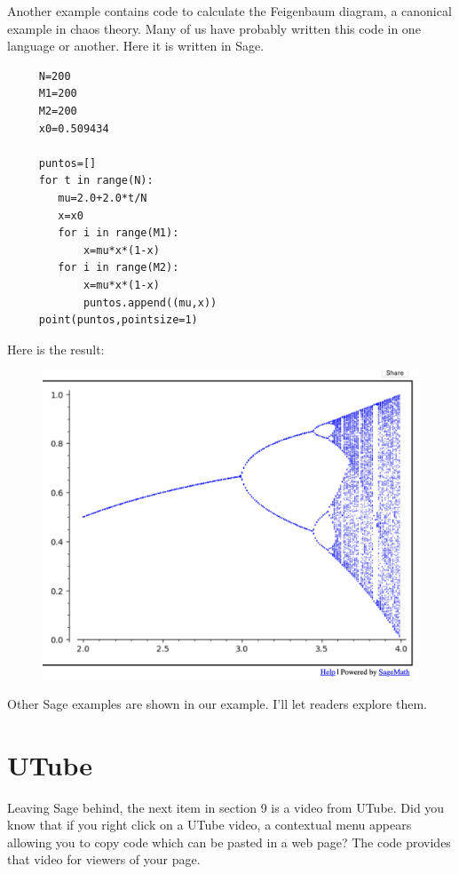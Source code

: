 \documentclass[11pt, oneside]{article}   	%
\begin{document}
\newpage

Another example contains code to calculate the Feigenbaum diagram, a canonical example in chaos theory.
Many of us have probably written this code in one language or another. Here it is written in Sage.

\begin{verbatim}
     N=200
     M1=200
     M2=200
     x0=0.509434

     puntos=[]
     for t in range(N):
        mu=2.0+2.0*t/N
        x=x0
        for i in range(M1):
            x=mu*x*(1-x)
        for i in range(M2):
            x=mu*x*(1-x)
            puntos.append((mu,x))
     point(puntos,pointsize=1)
\end{verbatim}

Here is the result:
\begin{figure}[H] %
     \hspace{.2in}  \includegraphics[width=4.5in.]{Graphics/shot11.png} %
\end{figure}

\newpage

Other Sage examples are shown in our example. I'll let readers explore them.

\section{UTube}

Leaving Sage behind, the next item in section 9 is a video from UTube. Did you know that if you right click on a UTube video, a contextual menu appears allowing you to copy code which can be pasted in a web page? The code provides that video for  viewers of your page.
\end{document}
